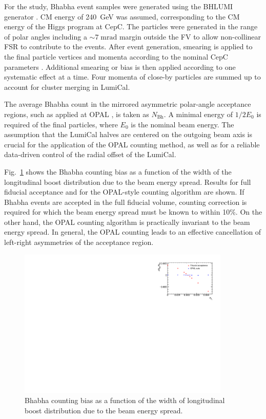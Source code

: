 For the study, Bhabha event samples were generated using the BHLUMI generator \cite{Bhlumi97}. CM energy of 240~GeV was assumed, corresponding to the CM energy of the Higgs program at CepC. The particles were generated in the range of polar angles including a $\sim7\;\mathrm{mrad}$ margin outside the FV to allow non-collinear FSR to contribute to the events. After event generation, smearing is applied to the final particle vertices and momenta according to the nominal CepC parameters \cite{cepcweb}. Additional smearing or bias is then applied according to one systematic effect at a time. Four momenta of close-by particles are summed up to account for cluster merging in LumiCal.

The average Bhabha count in the mirrored asymmetric polar-angle acceptance regions, such as applied at OPAL \cite{opal2000}, is taken as $N_{\mathrm{Bh}}$. A minimal energy of $1/2E_0$ is required of the final particles, where $E_0$ is the nominal beam energy. The assumption that the LumiCal halves are centered on the outgoing beam axis is crucial for the application of the OPAL counting method, as well as for a reliable data-driven control of the radial offset of the LumiCal.

Fig.~\ref{fig:bes} shows the Bhabha counting bias as a function of the width of the longitudinal boost distribution due to the beam energy spread. Results for full fiducial acceptance and for the OPAL-style counting algorithm are shown. If Bhabha events are accepted in the full fiducial volume, counting correction is required for which the beam energy spread must be known to within 10\%. On the other hand, the OPAL counting algorithm is practically invariant to the beam energy spread. In general, the OPAL counting leads to an effective cancellation of left-right asymmetries of the acceptance region.

\begin{figure}
	\centering
	\includegraphics[width=0.9\textwidth]{Figures/MDI/beamEnergySpread}
	\caption{Bhabha counting bias as a function of the width of longitudinal boost distribution due to the beam energy spread. }
	\label{fig:bes}
\end{figure}

